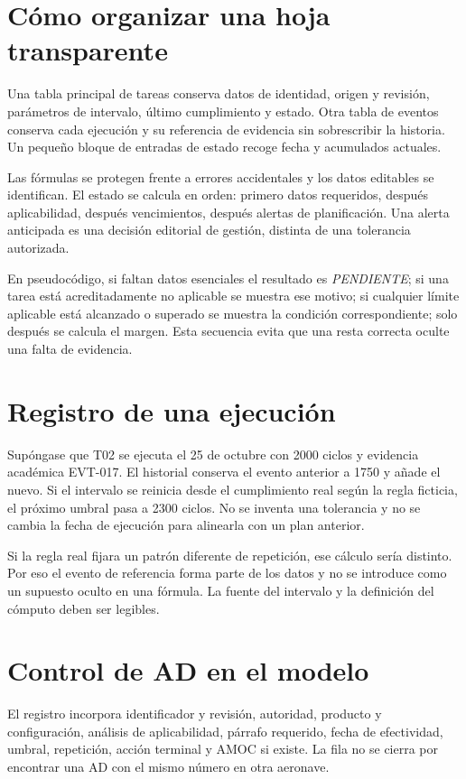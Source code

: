 \section{Cómo organizar una hoja transparente}
Una tabla principal de tareas conserva datos de identidad, origen y revisión, parámetros de intervalo, último cumplimiento y estado. Otra tabla de eventos conserva cada ejecución y su referencia de evidencia sin sobrescribir la historia. Un pequeño bloque de entradas de estado recoge fecha y acumulados actuales.

Las fórmulas se protegen frente a errores accidentales y los datos editables se identifican. El estado se calcula en orden: primero datos requeridos, después aplicabilidad, después vencimientos, después alertas de planificación. Una alerta anticipada es una decisión editorial de gestión, distinta de una tolerancia autorizada.

En pseudocódigo, si faltan datos esenciales el resultado es \textit{PENDIENTE}; si una tarea está acreditadamente no aplicable se muestra ese motivo; si cualquier límite aplicable está alcanzado o superado se muestra la condición correspondiente; solo después se calcula el margen. Esta secuencia evita que una resta correcta oculte una falta de evidencia.
\section{Registro de una ejecución}
Supóngase que T02 se ejecuta el 25 de octubre con 2000 ciclos y evidencia académica EVT-017. El historial conserva el evento anterior a 1750 y añade el nuevo. Si el intervalo se reinicia desde el cumplimiento real según la regla ficticia, el próximo umbral pasa a 2300 ciclos. No se inventa una tolerancia y no se cambia la fecha de ejecución para alinearla con un plan anterior.

Si la regla real fijara un patrón diferente de repetición, ese cálculo sería distinto. Por eso el evento de referencia forma parte de los datos y no se introduce como un supuesto oculto en una fórmula. La fuente del intervalo y la definición del cómputo deben ser legibles.
\section{Control de AD en el modelo}
El registro incorpora identificador y revisión, autoridad, producto y configuración, análisis de aplicabilidad, párrafo requerido, fecha de efectividad, umbral, repetición, acción terminal y AMOC si existe. La fila no se cierra por encontrar una AD con el mismo número en otra aeronave.

